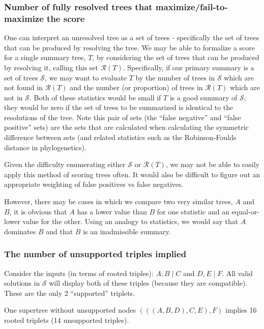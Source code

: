 \documentclass[11pt]{article}
\begin{document}
\subsubsection{Number of fully resolved trees that maximize/fail-to-maximize the \SWIPSD score}
One can interpret an unresolved tree as a set of trees - specifically the set of trees that 
    can be produced by resolving the tree.
We may be able to formalize a score for a single summary tree, $T$, by considering
    the set of trees that can be produced by resolving it, calling this set $\mathcal{R}(T)$.
Specifically, if our primary summary is a set of trees $\mathcal{S}$, we may want
    to evaluate $T$ by the number of trees in $\mathcal{S}$ which are not found
    in $\mathcal{R}(T)$ 
    and the number (or proportion) of trees in $\mathcal{R}(T)$ which
    are not in $\mathcal{S}$.
Both of these statistics would be small if $T$ is a good summary of $\mathcal{S}$; they 
    would be zero if the set of trees to be summarized is identical to the resolutions
    of the tree.
Note this pair of sets (the ``false negative'' and ``false positive'' sets) are the
    sets that are calculated when calculating the symmetric difference between 
    sets (and related statistics such as the Robinson-Foulds distance in phylogenetics).

Given the difficulty enumerating either $\mathcal{S}$ or $\mathcal{R}(T)$, we may not be able to easily 
    apply this method of scoring trees often.
It would also be difficult to figure out an appropriate weighting of false positives vs false negatives.

However, there may be cases in which we compare two very similar trees, $A$ and $B$, it is obvious
    that $A$ has a lower value than $B$ for one statistic and an equal-or-lower value for the other.
Using an analogy to statistics, we would say that $A$ dominates $B$ and that $B$ is an inadmissible summary.

\subsubsection{The number of unsupported triples implied}

Consider the inputs (in terms of rooted triples): $A,B\mid C$ and $D,E\mid F$.
All valid solutions in $\mathcal{S}$ will display both of these triples (because they are compatible).
These are the only 2 ``supported'' triplets.

One supertree without unsupported nodes $(((A,B,D),C,E),F)$ 
implies 16 rooted triplets (14 unsupported triples).
\end{document}
